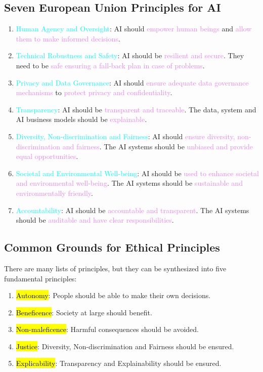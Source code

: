 \documentclass{book}
\begin{document}
\subsection{Seven European Union Principles for AI}
\begin{enumerate}
    \item \textcolor{cyan}{Human Agency and Oversight}: AI should \textcolor{violet}{empower human beings} and \textcolor{violet}{allow them to make informed decisions}.
    \item \textcolor{cyan}{Technical Robustness and Safety}: AI should be \textcolor{violet}{resilient and secure}. They need to be \textcolor{violet}{safe ensuring a fall-back plan in case of problems}.
    \item \textcolor{cyan}{Privacy and Data Governance}: AI should \textcolor{violet}{ensure adequate data governance mechanisms} to \textcolor{violet}{protect privacy and confidentiality}.
    \item \textcolor{cyan}{Transparency}: AI should be \textcolor{violet}{transparent and traceable}. The data, system and AI business models should be \textcolor{violet}{explainable}.
    \item \textcolor{cyan}{Diversity, Non-discrimination and Fairness}: AI should \textcolor{violet}{ensure diversity, non-discrimination and fairness}. The AI systems should be \textcolor{violet}{unbiased and provide equal opportunities}.
    \item \textcolor{cyan}{Societal and Environmental Well-being}: AI should be \textcolor{violet}{used to enhance societal and environmental well-being}. The AI systems should be \textcolor{violet}{sustainable and environmentally friendly}.
    \item \textcolor{cyan}{Accountability}: AI should be \textcolor{violet}{accountable and transparent}. The AI systems should be \textcolor{violet}{auditable and have clear responsibilities}.
\end{enumerate}
\subsection{Common Grounds for Ethical Principles}
There are many lists of principles, but they can be synthesized into five fundamental principles:
\begin{enumerate}
    \item \textcolor{red}{\hl{Autonomy}}: People should be able to make their own decisions.
    \item \textcolor{red}{\hl{Beneficence}}: Society at large should benefit.
    \item \textcolor{red}{\hl{Non-maleficence}}: Harmful consequences should be avoided.
    \item \textcolor{red}{\hl{Justice}}: Diversity, Non-discrimination and Fairness should be ensured.
    \item \textcolor{red}{\hl{Explicability}}: Transparency and Explainability should be ensured.
\end{enumerate}
\end{document}
